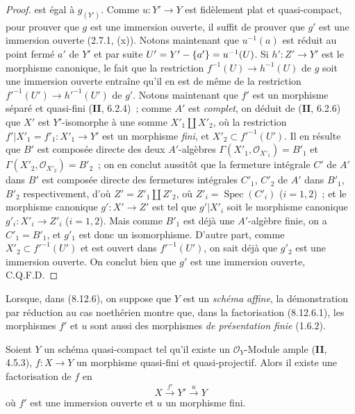 \begin{proof}
est égal à $g_{(Y')}$. Comme $u:Y'\to Y$ est fidèlement plat et
quasi-compact, pour prouver que $g$ est une immersion ouverte, il suffit de
prouver que $g'$ est une immersion ouverte (2.7.1, (x)). Notons maintenant
que $u^{-1}(a)$ est réduit au point fermé $a'$ de $Y'$ et par suite
$U'=Y'-\{a'\}=u^{-1}(U)$. Si $h':Z'\to Y'$ est le morphisme canonique, le
fait que la restriction $f^{-1}(U)\to h^{-1}(U)$ de $g$ soit une immersion
ouverte entraîne qu'il en est de même de la restriction
$f'^{-1}(U')\to h'^{-1}(U')$ de $g'$. Notons maintenant que $f'$ est un
morphisme séparé et quasi-fini (\textbf{II}, 6.2.4)~; comme $A'$ est \emph{complet},
on déduit de (\textbf{II}, 6.2.6) que $X'$ est $Y'$-isomorphe à une somme
$X'_1\amalg X'_2$, où la restriction
$f'|X'_1=f'_1:X'_1\to Y'$ est un morphisme \emph{fini}, et
$X'_2\subset f'^{-1}(U')$. Il en résulte que $B'$ est composée directe des
deux $A'$-algèbres
$\Gamma(X'_1,\mathcal O_{X'_1})=B'_1$ et
$\Gamma(X'_2,\mathcal O_{X'_2})=B'_2$~; on en conclut aussitôt que la
fermeture intégrale $C'$ de $A'$ dans $B'$ est composée directe des
fermetures intégrales $C'_1$, $C'_2$ de $A'$ dans $B'_1$, $B'_2$
respectivement, d'où $Z'=Z'_1\amalg Z'_2$, où
$Z'_i=\operatorname{Spec}(C'_i)$ ($i=1,2$)~; et le morphisme canonique
$g':X'\to Z'$ est tel que $g'|X'_i$ soit le morphisme canonique
$g'_i:X'_i\to Z'_i$ ($i=1,2$). Mais comme $B'_1$ est déjà une
$A'$-algèbre finie, on a $C'_1=B'_1$, et $g'_1$ est donc un isomorphisme.
D'autre part, comme $X'_2\subset f'^{-1}(U')$ et est ouvert dans
$f'^{-1}(U')$, on sait
déjà que $g'_2$ est une immersion ouverte. On conclut bien que $g'$ est une
immersion ouverte, C.Q.F.D.
\end{proof}

\begin{remark}[8.12.7]
\label{IV.8.12.7-fr}
Lorsque, dans (8.12.6), on suppose que $Y$ est un \emph{schéma affine}, la
démonstration par réduction au cas noethérien montre que, dans la
factorisation (8.12.6.1), les morphismes $f'$ et $u$ sont aussi des
morphismes \emph{de présentation finie} (1.6.2).
\end{remark}

\begin{corollary}[8.12.8]
\label{IV.8.12.8-fr}
Soient $Y$ un schéma quasi-compact tel qu'il existe un $\mathcal O_Y$-Module
ample \textup{(\textbf{II}, 4.5.3)}, $f:X\to Y$ un morphisme quasi-fini et quasi-projectif.
Alors il existe une factorisation de $f$ en
\[
X\xrightarrow{f'}Y'\xrightarrow{u}Y
\]
où $f'$ est une immersion ouverte et $u$ un morphisme fini.
\end{corollary}

